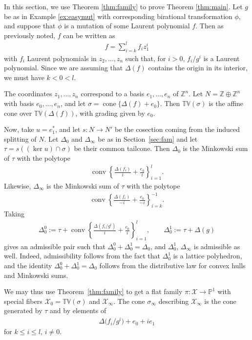 \documentclass[11pt]{article}
\newcommand{\ZZ}{\mathbb Z}
\newcommand{\PP}{\mathbb{P}}
\newcommand{\tv}{\mathbb{TV}}
\newcommand{\cX}{\mathcal{X}}
\DeclareMathOperator{\conv}{conv}
\DeclareMathOperator{\cone}{cone}
\begin{document}
In this section, we use Theorem \ref{thm:family} to prove Theorem \ref{thm:main}. Let $g$ be as in Example \ref{ex:easymut} with corresponding birational transformation $\phi$, and suppose that $\phi$ is a mutation of some Laurent polynomial $f$. Then as previously noted,
$f$ can be written as
\begin{gather*}
f=\sum_{i=k}^l f_i z_1^i
\end{gather*}
with $f_i$ Laurent polynomials in $z_2,\ldots,z_n$ such that, for $i>0$, $f_i/g^i$ is a Laurent polynomial. Since we are assuming that $\Delta(f)$ contains the origin in its interior, we must have $k<0<l$.


The coordinates $z_1,\ldots,z_n$ correspond to a basis $e_1,\ldots,e_n$ of $\ZZ^n$.
Let $N=\ZZ\oplus \ZZ^n$ with basis $e_0,\ldots,e_n$, and let $\sigma=\cone\{\Delta(f)+e_0\}$. Then $\tv(\sigma)$ is the af\/f\/ine cone over $\tv(\Delta(f))$, with grading given by $e_0$.

Now, take $u=e_1^*$, and let $s:N\to N'$ be the cosection coming from the induced splitting of $N$.
Let $\Delta_0$ and $\Delta_\infty$ be as in Section~\ref{sec:fam}
and let $\tau= s( (\ker u)\cap \sigma)$ be their common tailcone.
Then $\Delta_0$ is the Minkowski sum of $\tau$ with the  polytope
\begin{gather*}
\conv \left \{\frac{\Delta(f_i)}{i}+\frac{e_0}{i}\right\}_{i=1}^l.
\end{gather*}
Likewise, $\Delta_\infty$ is the Minkowski sum of $\tau$ with the polytope
\begin{gather*}
\conv \left\{\frac{\Delta(f_i)}{-i}+\frac{e_0}{-i} \right\}_{i=k}^{-1}.
\end{gather*}
Taking
\begin{gather*}
\Delta_0^0 :=\tau+\conv \left \{\frac{\Delta(f_i/g^i)}{i}+\frac{e_0}{i}\right\}_{i=1}^l,\qquad
\Delta_0^1 :=\tau+\Delta(g)
\end{gather*}
gives an admissible pair such that $\Delta_0^0+\Delta_0^1=\Delta_0$, and $\Delta_0^1$, $\Delta_\infty$ is admissible as well. Indeed, admissibility follows from the fact that $\Delta_0^1$ is a lattice polyhedron, and the identity $\Delta_0^0+\Delta_0^1=\Delta_0$ follows from the distributive law for convex hulls and Minkowski sums.


We may thus use Theorem~\ref{thm:family} to get a f\/lat family $\pi:\cX\to\PP^1$ with special f\/ibers $\cX_0=\tv(\sigma)$ and $\cX_\infty$.
The cone $\sigma_\infty$ describing $\cX_\infty$ is the cone generated by $\tau$ and by elements of
\begin{gather*}
\Delta\big(f_i/g^i\big)+e_0+ie_1
\end{gather*}
for $k\leq i \leq l$, $i\neq 0$.
\end{document}
